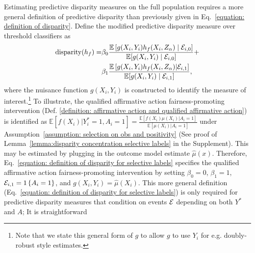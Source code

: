 \documentclass{article}
\begin{document}
Estimating predictive disparity measures  on the full population requires a more general definition of predictive disparity than previously given in Eq.~\ref{equation: definition of disparity}. Define the modified predictive disparity measure over threshold classifiers as
\begin{align}\label{equation: definition of disparity for selective labels}
    \begin{split}
    \operatorname{disparity}(h_f) = &\beta_0 \frac{\mathbb{E}\left[ g(X_i,Y_i) h_f(X_i, Z_\alpha) \mid \mathcal{E}_{i,0} \right]}{\mathbb{E}[g(X_i,Y_i) \mid \mathcal{E}_{i,0} ]} + \\
&\beta_1 \frac{\mathbb{E}\left[ g(X_i,Y_i)h_f(X_i, Z_\alpha) | \mathcal{E}_{i,1} \right]}{\mathbb{E}[g(X_i,Y_i) \mid \mathcal{E}_{i,1} ]},
    \end{split}
\end{align} 
where the nuisance function $g(X_i,Y_i)$ is constructed to identify the measure of interest.\footnote{Note that we state this general form of $g$ to allow $g$ to use $Y_i$ for e.g. doubly-robust style estimates.}
To illustrate, the qualified affirmative action fairness-promoting intervention (Def. \ref{definition: affirmative action and qualified affirmative action}) is identified as $ \mathbb{E}[f(X_i) | Y_i^* = 1, A_i = 1] = \frac{\mathbb{E}[f(X_i) \mu(X_i) | A_i = 1]}{\mathbb{E}[ \mu(X_i) | A_i = 1]}$ under Assumption~\ref{assumption: selection on obs and positivity} (See proof of Lemma~\ref{lemma:disparity concentration selective labels} in the Supplement). This may be estimated by plugging in the outcome model estimate $\hat \mu(x)$. 
Therefore, Eq.~\ref{equation: definition of disparity for selective labels} specifies the qualified affirmative action fairness-promoting intervention by setting $\beta_0 = 0$, $\beta_1 = 1$,  $\mathcal{E}_{i,1} = 1\left\{A_i =1\right\}$, and $g(X_i, Y_i) = \hat \mu(X_i)$. This more general definition (Eq.~\ref{equation: definition of disparity for selective labels}) is only required for predictive disparity measures that condition on events $\mathcal{E}$ depending on both $Y^*$ and $A$; It is straightforward %
\end{document}
